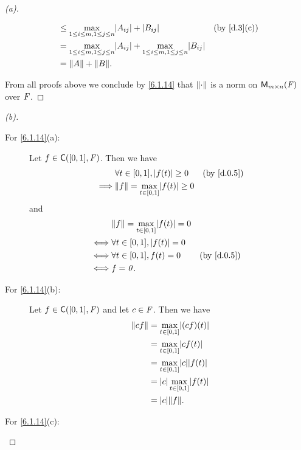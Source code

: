 \begin{proof}[(a)]
\begin{description}
\begin{align*}
                     & \leq \max_{1 \leq i \leq m, 1 \leq j \leq n} \abs{A_{i j}} + \abs{B_{i j}}                                      &  & \by{d.3}[c] \\
                     & = \max_{1 \leq i \leq m, 1 \leq j \leq n} \abs{A_{i j}} + \max_{1 \leq i \leq m, 1 \leq j \leq n} \abs{B_{i j}}                  \\
                     & = \norm{A} + \norm{B}.
      \end{align*}
  \end{description}
  From all proofs above we conclude by \cref{6.1.14} that \(\left\lVert\cdot\right\rVert\) is a norm on \(\ms\) over \(\mathit{F}\).
\end{proof}

\begin{proof}[(b)]
  \begin{description}
    \item[For \cref{6.1.14}(a):]
      Let \(f \in \cfs([0, 1], \F)\).
      Then we have
      \begin{align*}
                 & \forall t \in [0, 1], \abs{f(t)} \geq 0          &  & \by{d.0.5} \\
        \implies & \norm{f} = \max_{t \in [0, 1]} \abs{f(t)} \geq 0
      \end{align*}
      and
      \begin{align*}
             & \norm{f} = \max_{t \in [0, 1]} \abs{f(t)} = 0                 \\
        \iff & \forall t \in [0, 1], \abs{f(t)} = 0                          \\
        \iff & \forall t \in [0, 1], f(t) = 0                &  & \by{d.0.5} \\
        \iff & f = \zv.
      \end{align*}
    \item[For \cref{6.1.14}(b):]
      Let \(f \in \cfs([0, 1], \F)\) and let \(c \in \mathit{F}\).
      Then we have
      \begin{align*}
        \norm{cf} & = \max_{t \in [0, 1]} \abs{(cf)(t)}      \\
                  & = \max_{t \in [0, 1]} \abs{cf(t)}        \\
                  & = \max_{t \in [0, 1]} \abs{c} \abs{f(t)} \\
                  & = \abs{c} \max_{t \in [0, 1]} \abs{f(t)} \\
                  & = \abs{c} \norm{f}.
      \end{align*}
    \item[For \cref{6.1.14}(c):]

\end{description}
\end{proof}
